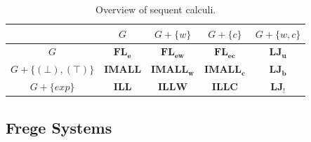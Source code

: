 \documentclass[12pt,a4paper]{article}
\theoremstyle{plain}
\theoremstyle{definition}
\newcommand{\BFL}{\mathbf{FL_e}}
\newcommand{\IPC}{\mathsf{IPC}}
\newcommand{\CPC}{\mathsf{CPC}}
\newcommand{\BIMALL}{\mathbf{IMALL}}
\newcommand{\BILL}{\mathbf{ILL}}
\newcommand{\BAIMALL}{\mathbf{IMALL_{w}}}
\newcommand{\BRIMALL}{\mathbf{IMALL_c}}
\newcommand{\BAILL}{\mathbf{ILLW}}
\newcommand{\BRILL}{\mathbf{ILLC}}
\newcommand{\BFLw}{\mathbf{FL_{ew}}}
\newcommand{\BFLc}{\mathbf{FL_{ec}}}
\newcommand{\LJ}{\mathbf{LJ}}
\newcommand{\LK}{\mathbf{LK}}
\newcommand{\LKu}{\mathbf{LK_u}}
\newcommand{\LKb}{\mathbf{LK_b}}
\newcommand{\LKajab}{\mathbf{LK_!}}
\newcommand{\LJu}{\mathbf{LJ_u}}
\newcommand{\LJb}{\mathbf{LJ_b}}
\newcommand{\LJajab}{\mathbf{LJ_!}}
\begin{document}
\begin{table}[ht]
\centering
\small
\renewcommand{\arraystretch}{1.5}
\setlength{\tabcolsep}{8pt}

\begin{tabular}{|c|c|c|c|c|}
\hline
 & $G$ & $G + \{w\}$ & $G + \{c\}$ & $G + \{w,c\}$ \\ \hline
$G$ & $\BFL$ & $\BFLw$ & $\BFLc$ & $\LJu$ \\ \hline
$G+ \{(\bot),(\top)\}$ & $\BIMALL$ & $\BAIMALL$ & $\BRIMALL$ & $\LJb$ \\ \hline
$G+ \{exp\}$ & $\BILL$ & $\BAILL$ & $\BRILL$ & $\LJajab$ \\ \hline
\end{tabular}

\caption{Overview of sequent calculi.}
\label{Fig: linear Seq cal}
\end{table}



\subsection{Frege Systems}
\end{document}

